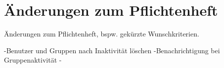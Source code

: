 \section{Änderungen zum Pflichtenheft}

Änderungen zum Pflichtenheft, bspw. gekürzte Wunschkriterien.

-Benutzer und Gruppen nach Inaktivität löschen
-Benachrichtigung bei Gruppenaktivität
-